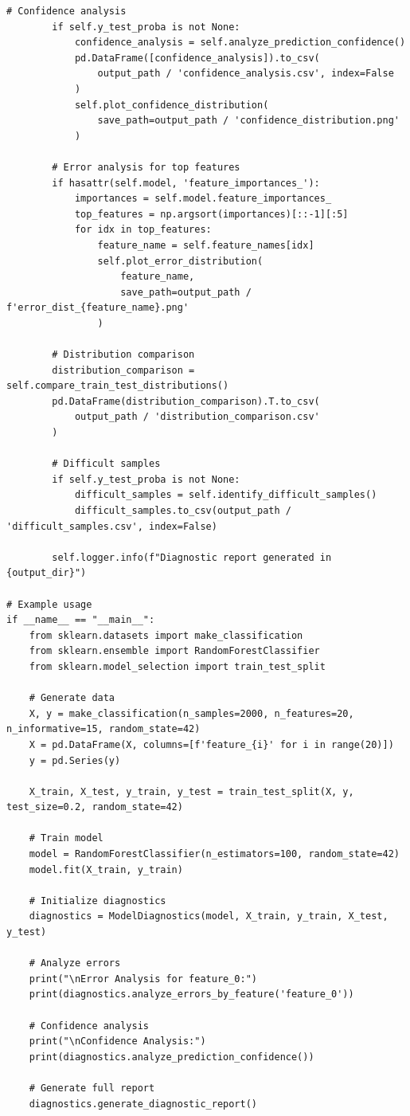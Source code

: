 \begin{lstlisting}[style=python, caption={Comprehensive Model Diagnostic Tools}]
        # Confidence analysis
        if self.y_test_proba is not None:
            confidence_analysis = self.analyze_prediction_confidence()
            pd.DataFrame([confidence_analysis]).to_csv(
                output_path / 'confidence_analysis.csv', index=False
            )
            self.plot_confidence_distribution(
                save_path=output_path / 'confidence_distribution.png'
            )

        # Error analysis for top features
        if hasattr(self.model, 'feature_importances_'):
            importances = self.model.feature_importances_
            top_features = np.argsort(importances)[::-1][:5]
            for idx in top_features:
                feature_name = self.feature_names[idx]
                self.plot_error_distribution(
                    feature_name,
                    save_path=output_path / f'error_dist_{feature_name}.png'
                )

        # Distribution comparison
        distribution_comparison = self.compare_train_test_distributions()
        pd.DataFrame(distribution_comparison).T.to_csv(
            output_path / 'distribution_comparison.csv'
        )

        # Difficult samples
        if self.y_test_proba is not None:
            difficult_samples = self.identify_difficult_samples()
            difficult_samples.to_csv(output_path / 'difficult_samples.csv', index=False)

        self.logger.info(f"Diagnostic report generated in {output_dir}")

# Example usage
if __name__ == "__main__":
    from sklearn.datasets import make_classification
    from sklearn.ensemble import RandomForestClassifier
    from sklearn.model_selection import train_test_split

    # Generate data
    X, y = make_classification(n_samples=2000, n_features=20, n_informative=15, random_state=42)
    X = pd.DataFrame(X, columns=[f'feature_{i}' for i in range(20)])
    y = pd.Series(y)

    X_train, X_test, y_train, y_test = train_test_split(X, y, test_size=0.2, random_state=42)

    # Train model
    model = RandomForestClassifier(n_estimators=100, random_state=42)
    model.fit(X_train, y_train)

    # Initialize diagnostics
    diagnostics = ModelDiagnostics(model, X_train, y_train, X_test, y_test)

    # Analyze errors
    print("\nError Analysis for feature_0:")
    print(diagnostics.analyze_errors_by_feature('feature_0'))

    # Confidence analysis
    print("\nConfidence Analysis:")
    print(diagnostics.analyze_prediction_confidence())

    # Generate full report
    diagnostics.generate_diagnostic_report()
\end{lstlisting}

